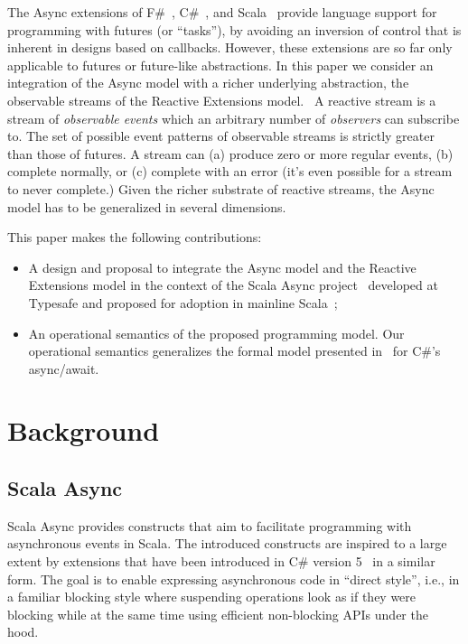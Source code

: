 \documentclass{acm_proc_article-sp}
\begin{document}
The Async extensions of F\#~\cite{SymePL11}, C\#~\cite{FormalizingAsync}, and
Scala~\cite{ScalaAsyncSIP} provide language support for programming with
futures (or ``tasks''), by avoiding an inversion of control that is inherent
in designs based on callbacks. However, these extensions are so far only
applicable to futures or future-like abstractions. In this paper we consider
an integration of the Async model with a richer underlying abstraction, the
observable streams of the Reactive Extensions model.~\cite{RxCACM} A reactive
stream is a stream of {\em observable events} which an arbitrary number of
{\em observers} can subscribe to. The set of possible event patterns of
observable streams is strictly greater than those of futures. A stream can (a) produce zero or more regular events, (b) complete normally, or (c) complete with an error (it's even possible for a stream to never complete.) Given the richer substrate of reactive streams, the Async model has to be
generalized in several dimensions.

This paper makes the following contributions:
\begin{itemize}
  \item A design and proposal to integrate the Async model and the Reactive Extensions model in the context
    of the Scala Async project~\cite{ScalaAsync} developed at Typesafe and proposed for adoption in 
    mainline Scala~\cite{ScalaAsyncSIP};
  \item An operational semantics of the proposed programming model. Our operational semantics generalizes the 
    formal model presented in~\cite{FormalizingAsync} for C\#'s async/await.
\end{itemize}


\section{Background}

\subsection{Scala Async}\label{sec:scala-async}

Scala Async provides constructs that aim to facilitate programming with
asynchronous events in Scala. The introduced constructs are inspired to a
large extent by extensions that have been introduced in C\# version 5~\cite{Hejlsberg:2011:CPL} in a
similar form. The goal is to enable expressing
asynchronous code in ``direct style'', i.e., in a familiar blocking style
where suspending operations look as if they were blocking while at the same
time using efficient non-blocking APIs under the hood.
\end{document}
